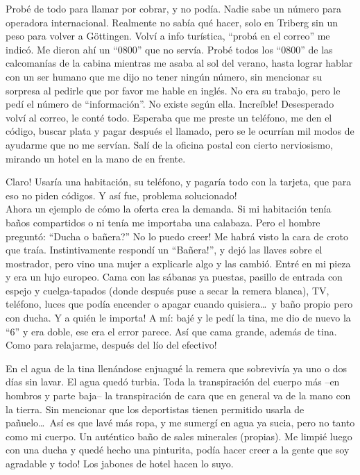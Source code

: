 Prob\'e de todo para llamar por cobrar, y no pod\'ia. Nadie sabe un n\'umero
para operadora internacional. Realmente no sab\'ia qu\'e hacer, solo en
Triberg sin un peso para volver a G\"ottingen. Volv\'i a info tur\'istica,
``prob\'a en el correo'' me indic\'o. Me dieron ah\'i un ``0800'' que no
serv\'ia. Prob\'e todos los ``0800'' de las calcoman\'ias de la cabina mientras
me asaba al sol del verano, hasta lograr hablar con un ser humano que me dijo no
tener ning\'un n\'umero, sin mencionar su sorpresa al pedirle que por favor me
hable en ingl\'es. No era su trabajo, pero le ped\'i el n\'umero de
``informaci\'on''. No existe seg\'un ella. \textexclamdown Incre\'ible!
Desesperado volv\'i al correo, le cont\'e todo. Esperaba que me preste un
tel\'efono, me den el c\'odigo, buscar plata y pagar despu\'es el llamado, pero
se le ocurr\'ian mil modos de ayudarme que no me serv\'ian. Sal\'i de la oficina
postal con cierto nerviosismo, mirando un hotel en la mano de en frente.

\textexclamdown Claro! Usar\'ia una habitaci\'on, su tel\'efono, y pagar\'ia
todo con la tarjeta, que para eso no piden c\'odigos. Y as\'i fue,
\textexclamdown problema solucionado!\\

Ahora un ejemplo de c\'omo la oferta crea la demanda. Si mi
habitaci\'on ten\'ia ba\~nos compartidos o ni ten\'ia me importaba una
calabaza. Pero el hombre pregunt\'o: ``\textquestiondown Ducha o ba\~nera?''
\textexclamdown No lo puedo creer! Me habr\'a visto la cara de croto que
tra\'ia. Instintivamente respond\'i un ``\textexclamdown Ba\~nera!'', y dej\'o
las llaves sobre el mostrador, pero vino una mujer a explicarle algo y las
cambi\'o. Entr\'e en mi pieza y era un lujo europeo. Cama con las s\'abanas ya
puestas, pasillo de entrada con espejo y cuelga-tapados (donde despu\'es puse
a secar la remera blanca), {\small TV}, tel\'efono, luces que pod\'ia
encender o apagar cuando quisiera\ldots\ y ba\~no propio pero con ducha.
\textexclamdown Y a qui\'en le importa! A m\'i: baj\'e y le ped\'i la tina, me
dio de nuevo la ``6'' y era doble, ese era el error parece. As\'i que cama
grande, adem\'as de tina. \textexclamdown Como para relajarme, despu\'es del
l\'io del efectivo!

En el agua de la tina llen\'andose enjuagu\'e la remera que sobreviv\'ia ya
uno o dos d\'ias sin lavar. El agua qued\'o turbia. Toda la transpiraci\'on
del cuerpo m\'as --en hombros y parte baja-- la transpiraci\'on de cara que en
general va de la mano con la tierra. Sin mencionar que los deportistas tienen
permitido usarla de pa\~nuelo\ldots\ As\'i es que lav\'e m\'as ropa, y me
sumerg\'i en agua ya sucia, pero no tanto como mi cuerpo. Un aut\'entico
ba\~no de sales minerales (propias). Me limpi\'e luego con una ducha y
qued\'e hecho una pinturita, \textexclamdown pod\'ia hacer creer a la gente
que soy agradable y todo! Los jabones de hotel hacen lo suyo.

